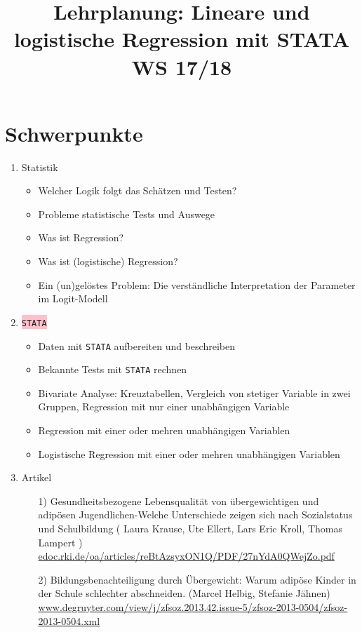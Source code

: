 \documentclass[a4paper,fontsize=14pt]{article}
\title{Lehrplanung: Lineare und logistische Regression mit STATA WS 17/18}
\date{\vspace{-10ex}}
\begin{document}
\maketitle


\section{Schwerpunkte}
\begin{enumerate}
\item{\colorbox{yellow!60}{Statistik }
\begin{itemize}
\item{Welcher Logik folgt das Schätzen und Testen?}
\item{Probleme statistische Tests und Auswege}
\item{Was ist  Regression?}
\item{Was ist (logistische) Regression?}
\item{Ein (un)gelöstes Problem: Die verständliche Interpretation der Parameter im Logit-Modell} %
\end{itemize}}
\item{\colorbox{pink}{\texttt{STATA}}
\begin{itemize}
\item{Daten mit \texttt{STATA} aufbereiten und beschreiben}
\item{Bekannte Tests mit \texttt{STATA} rechnen}
\item{Bivariate Analyse: Kreuztabellen, Vergleich von stetiger Variable in zwei Gruppen, Regression mit nur einer unabhängigen Variable}
\item{Regression mit einer oder  mehren unabhängigen Variablen}
\item{Logistische Regression mit einer oder  mehren unabhängigen Variablen}
\end{itemize}
}
\item{\colorbox{green!50}{Artikel}
\begin{itemize}
\item[1)]{Gesundheitsbezogene Lebensqualität von übergewichtigen 
und adipösen Jugendlichen-Welche Unterschiede zeigen sich nach  Sozialstatus und
Schulbildung ( Laura Krause, Ute Ellert, Lars Eric Kroll, Thomas Lampert )\\
\url{edoc.rki.de/oa/articles/reBtAzsyxON1Q/PDF/27nYdA0QWejZo.pdf}}
\item[2)]{ Bildungsbenachteiligung durch Übergewicht: Warum adipöse Kinder in der Schule schlechter abschneiden. (Marcel Helbig, Stefanie Jähnen)\\
\url{www.degruyter.com/view/j/zfsoz.2013.42.issue-5/zfsoz-2013-0504/zfsoz-2013-0504.xml}}
\end{itemize}
}
\end{enumerate}
\end{document}

